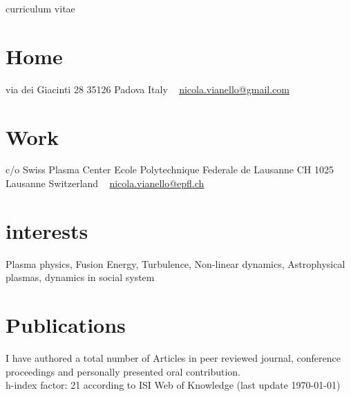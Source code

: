 \documentclass[a4paper]{nicola-cv}
\begin{document}
       {curriculum vitae}


\begin{aside}
  \section{Home}
    via dei Giacinti 28
    35126 Padova
    Italy
    ~
    \href{mailto:nicola.vianello@gmail.com}{nicola.vianello@gmail.com}
  \section{Work}
    c/o Swiss Plasma Center
    Ecole Polytechnique Federale de Lausanne
    CH 1025 Lausanne
    Switzerland
    ~
    \href{mailto:nicola.vianello@epfl.ch}{nicola.vianello@epfl.ch}
\end{aside}

\section{interests}

Plasma physics, Fusion Energy, Turbulence, Non-linear dynamics, 
Astrophysical plasmas, dynamics in social system



























\section{Publications}
\nocite{*}
I have authored a total number of \printbibliography[env=counter,
 heading=counter, type=article, resetnumbers=true] Articles in peer reviewed journal,  
 \printbibliography[env=counter, heading=counter, type=inproceedings, resetnumbers=true]
 conference proceedings and personally presented
 \printbibliography[env=counter, heading=counter, type=misc, resetnumbers=true] oral
 contribution. \\
h-index factor: 21 according to ISI Web of Knowledge (last update \today)
\end{document}

